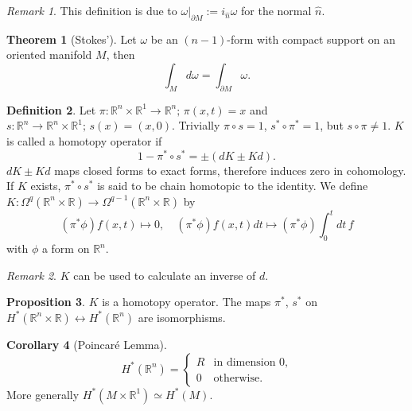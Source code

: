 \documentclass[twocolumn]{article}
\theoremstyle{definition}
\newtheorem{definition}{Definition}[section]
\newtheorem{theorem}[definition]{Theorem}
\newtheorem{proposition}[definition]{Proposition}
\newtheorem{corollary}[definition]{Corollary}
\theoremstyle{remark}
\newtheorem*{remark}{Remark}
\begin{document}
\begin{remark}
    This definition is due to $\omega|_{\partial M} := i_{\hat{n}} \omega$ for the normal $\hat{n}$.
\end{remark}
\begin{theorem}[Stokes']
    Let $\omega$ be an $(n-1)$-form with compact support on an oriented manifold $M$, then
    \begin{equation}
        \int_M d\omega = \int_{\partial M} \omega.
    \end{equation}
\end{theorem}

\begin{definition}
    Let $\pi: \mathbb{R}^n \times \mathbb{R}^1 \rightarrow \mathbb{R}^n;\, \pi(x, t) = x$ and
    $s: \mathbb{R}^n \rightarrow \mathbb{R}^n \times \mathbb{R}^1;\, s(x) = (x, 0)$.
    Trivially $\pi \circ s = 1$, $s^* \circ \pi^* = 1$, but $s \circ \pi \neq 1$.
    $K$ is called a homotopy operator if
    \begin{equation}
        1 - \pi^* \circ s^* = \pm(dK \pm Kd).
    \end{equation}
    $dK \pm Kd$ maps closed forms to exact forms, therefore induces zero in cohomology.
    If $K$ exists, $\pi^* \circ s^*$ is said to be chain homotopic to the identity.
    We define $K: \Omega^q(\mathbb{R}^n \times \mathbb{R}) \rightarrow \Omega^{q-1}(\mathbb{R}^n \times \mathbb{R})$ by
    \begin{equation}
        (\pi^* \phi)f(x, t) \mapsto 0,\quad
        (\pi^* \phi)f(x, t) dt \mapsto (\pi^* \phi) \int^t_0 dt\, f
    \end{equation}
    with $\phi$ a form on $\mathbb{R}^n$.
\end{definition}
\begin{remark}
    $K$ can be used to calculate an inverse of $d$.
\end{remark}
\begin{proposition}
    $K$ is a homotopy operator.
    The maps $\pi^*$, $s^*$ on $H^*(\mathbb{R}^n \times \mathbb{R}) \leftrightarrow H^*(\mathbb{R}^n)$ are isomorphisms.
\end{proposition}
\begin{corollary}[Poincaré Lemma]
    \begin{equation}
        H^*(\mathbb{R}^n) =
        \begin{cases}
            R & \textrm{in dimension 0,}\\
            0 & \textrm{otherwise.}
        \end{cases}
    \end{equation}
    More generally $H^*(M \times \mathbb{R}^1) \simeq H^*(M)$.
\end{corollary}
\end{document}
